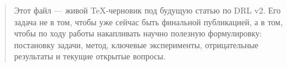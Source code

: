 \begin{abstract}
Этот файл --- живой TeX-черновик под будущую статью по DRL v2. Его задача не в том,
чтобы уже сейчас быть финальной публикацией, а в том, чтобы по ходу работы
накапливать научно полезную формулировку: постановку задачи, метод, ключевые
эксперименты, отрицательные результаты и текущие открытые вопросы.
\end{abstract}